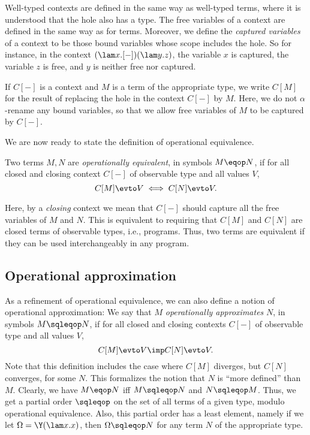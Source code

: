 \documentclass[12pt]{article}
\begin{document}
Well-typed contexts are defined in the same way as well-typed terms,
where it is understood that the hole also has a type. The free
variables of a context are defined in the same way as for terms.
Moreover, we define the {\em captured variables} of a context to be
those bound variables whose scope includes the hole.  So for instance,
in the context $(\lam x.[-])(\lam y.z)$, the variable $x$ is captured,
the variable $z$ is free, and $y$ is neither free nor captured. 

If $C[-]$ is a context and $M$ is a term of the appropriate type, we
write $C[M]$ for the result of replacing the hole in the context
$C[-]$ by $M$. Here, we do not $\alpha$-rename any bound variables, so
that we allow free variables of $M$ to be captured by $C[-]$.

We are now ready to state the definition of operational equivalence.

\begin{definition}
  Two terms $M,N$ are {\em operationally equivalent}, in symbols
  $M\eqop N$, if for all closed and closing context $C[-]$ of
  observable type and all values $V$,
  \[ C[M]\evto V \iff C[N]\evto V.
  \]
\end{definition}

Here, by a {\em closing} context we mean that $C[-]$ should capture
all the free variables of $M$ and $N$. This is equivalent to requiring
that $C[M]$ and $C[N]$ are closed terms of observable types, i.e.,
programs. Thus, two terms are equivalent if they can be used
interchangeably in any program.

\subsection{Operational approximation}

As a refinement of operational equivalence, we can also define a
notion of operational approximation: We say that $M$ {\em
  operationally approximates} $N$, in symbols $M\sqleqop N$, if for
all closed and closing contexts $C[-]$ of observable type and all
values $V$,
\[ C[M]\evto V \imp C[N]\evto V.
\]
Note that this definition includes the case where $C[M]$ diverges, but
$C[N]$ converges, for some $N$. This formalizes the notion that $N$ is
``more defined'' than $M$. Clearly, we have $M\eqop N$ iff $M\sqleqop
N$ and $N\sqleqop M$. Thus, we get a partial order $\sqleqop$ on the
set of all terms of a given type, modulo operational equivalence.
Also, this partial order has a least element, namely if we let
$\Omega=\Y(\lam x.x)$, then $\Omega\sqleqop N$ for any term $N$ of the
appropriate type.
\end{document}
